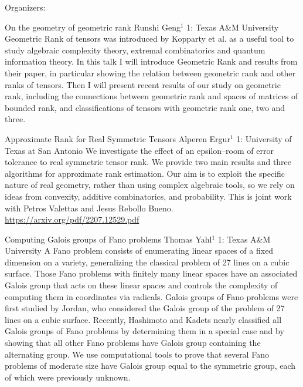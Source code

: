 \label{mini29}

\miniabs
{}
{Organizers: }
{}

\vspace{2ex}
\abs
{On the geometry of geometric rank}
{Runshi Geng$^{1}$}
{1: Texas A\&M University}
{Geometric Rank of tensors was introduced by Kopparty et al. as a useful tool to study algebraic complexity theory, extremal combinatorics and quantum information theory. In this talk I will introduce Geometric Rank and results from their paper, in particular showing the relation between geometric rank and other ranks of tensors. Then I will present recent results of our study on geometric rank, including the connections between geometric rank and spaces of matrices of bounded rank, and classifications of tensors with geometric rank one, two and three.}


\vspace{1.5ex}
\abs
{Approximate Rank for Real Symmetric Tensors}
{Alperen Ergur$^{1}$}
{1: University of Texas at San Antonio}
{We investigate the effect of an epsilon--room of error tolerance to real symmetric tensor rank. We provide two main results and three algorithms for approximate rank estimation. Our aim is to exploit the specific nature of real geometry, rather than using complex algebraic tools, so we rely on ideas from convexity, additive combinatorics, and probability. This is joint work with Petros Valettas and Jesus Rebollo Bueno. \href{https://arxiv.org/pdf/2207.12529.pdf}{https://arxiv.org/pdf/2207.12529.pdf}}


\vspace{1.5ex}
\abs
{Computing Galois groups of Fano problems}
{Thomas Yahl$^{1}$}
{1: Texas A\&M University}
{A Fano problem consists of enumerating linear spaces of a fixed dimension on a variety, generalizing the classical problem of 27 lines on a cubic surface. Those Fano problems with finitely many linear spaces have an associated Galois group that acts on these linear spaces and controls the complexity of computing them in coordinates via radicals. Galois groups of Fano problems were first studied by Jordan, who considered the Galois group of the problem of 27 lines on a cubic surface. Recently, Hashimoto and Kadets nearly classified all Galois groups of Fano problems by determining them in a special case and by showing that all other Fano problems have Galois group containing the alternating group. We use computational tools to prove that several Fano problems of moderate size have Galois group equal to the symmetric group, each of which were previously unknown. }


